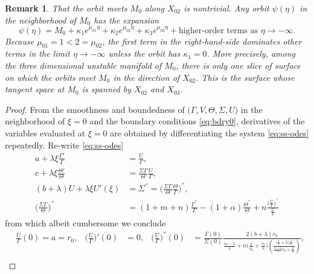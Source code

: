 \documentclass[a4paper,11pt]{article}
\newtheorem{remark}{Remark}[section]
\begin{document}
\begin{remark} \label{rem:alpha}
  That the orbit meets $M_0$ along $X_{02}$ is nontrivial. Any orbit $\psi(\eta)$ in the neighborhood of $M_0$ has the expansion
  $$  \psi(\eta) = M_0 + \kappa_1 e^{\mu_{01}\eta} + \kappa_2 e^{\mu_{02}\eta} + \kappa_3 e^{\mu_{03}\eta} + \text{higher-order terms as $\eta \rightarrow -\infty$}.$$
  Because $\mu_{01}=1<2=\mu_{02}$, the first term in the right-hand-side dominates other terms in the limit $\eta \rightarrow -\infty$ unless the orbit has $\kappa_1=0$. More precisely, among the three dimensional unstable manifold of $M_0$, there is only one slice of surface on which the orbits meet $M_0$ in the direction of $X_{02}$. This is the surface whose tangent space at $M_0$ is spanned by $X_{02}$ and $X_{03}$.
\end{remark}
\begin{proof}
From the smoothness and boundedness of $\big(\Gamma,V,\Theta,\Sigma,U\big)$ in the neighborhood of $\xi=0$ and the boundary conditions \eqref{eq:bdry0}, derivatives of the variables evaluated at $\xi=0$ are obtained by differentiating the system \eqref{eq:ss-odes} repeatedly. 
Re-write \eqref{eq:ss-odes}
\begin{align*}
  a + \lambda\xi\frac{\Gamma'}{\Gamma} &= \frac{U}{\Gamma},\\
  c + \lambda\xi\frac{\Theta'}{\Theta} &= \frac{\Sigma\Gamma}{\Theta} \frac{U}{\Gamma},\\
  (b+\lambda)U  + \lambda \xi U'(\xi) &= \Sigma^{''} = \Big(\frac{\Sigma\Gamma}{\Theta} \frac{\Theta}{\Gamma}\Big)^{''},\\
  \Big(\frac{\Sigma\Gamma}{\Theta}\Big)^{''} &= (1+m+n)\frac{\Gamma^{''}}{\Gamma}-(1+\alpha) \frac{\Theta^{''}}{\Theta} + n \frac{ \big(\frac{U}{\Gamma}\big)^{''}}{\frac{U}{\Gamma}}
\end{align*}
from which albeit cumbersome we conclude
\begin{align*}
&\frac{U}{\Gamma}(0) = a = r_0,  & \Big(\frac{U}{\Gamma}\Big)'(0)&=0, & \Big(\frac{U}{\Gamma}\Big)^{''}(0) &= \frac{\Gamma(0)}{\Sigma(0)} \frac{2(b+\lambda)r_0}{\frac{s_0-1}{\lambda}+n\Big(\frac{2}{s_0} + \frac{r_0}{\lambda}\Big)\left(\frac{ \big(\frac{1}{\lambda}+2\big) \frac{1}{r_0} }{ \frac{1+\alpha}{\lambda}r_0 + \frac{2}{s_0}}\right)},\\

\end{align*}
\end{proof}
\end{document}
